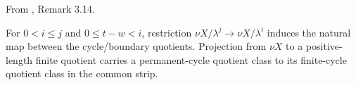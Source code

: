 \begin{proposition}
\label{sem:Literature:infinite-restriction}
From \cite{LWX126}, Remark 3.14.\par

For $0<i\le j$ and $0\le t-w<i$, restriction $\nu X/\lambda^j\to\nu X/\lambda^i$ induces the natural map between the cycle/boundary quotients. Projection from $\nu X$ to a positive-length finite quotient carries a permanent-cycle quotient class to its finite-cycle quotient class in the common strip.
\end{proposition}

